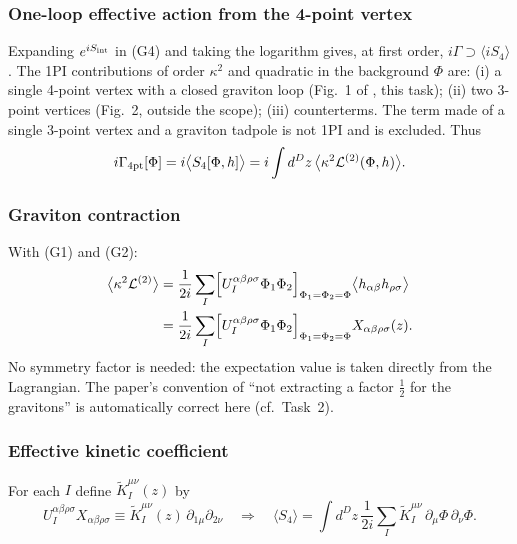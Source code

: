 \subsubsection{One-loop effective action from the 4-point vertex \texorpdfstring{\tD}{}}
Expanding \(e^{iS_{\rm int}}\) in (G4) and taking the logarithm gives, at first order,
\(i\Gamma\supset\langle iS_4\rangle\). The 1PI contributions of order \(\kappa^2\) and
quadratic in the background \(\Phi\) are:
(i) a single 4-point vertex with a closed graviton loop (Fig.~1 of \PI, this task);
(ii) two 3-point vertices (Fig.~2, outside the scope);
(iii) counterterms.
The term made of a single 3-point vertex and a graviton tadpole is not 1PI and is
excluded. Thus
\begin{equation}\label{eq:t3-Gamma4}
i\Gamma_{\rm 4pt}[\Phi]=i\bigl\langle S_4[\Phi,h]\bigr\rangle
=i\int d^Dz\,\bigl\langle\kappa^2\mathcal L^{(2)}(\Phi,h)\bigr\rangle .
\end{equation}

\subsubsection{Graviton contraction}
With (G1) and (G2):
\begin{equation}\label{eq:t3-contract}
\begin{aligned}
\bigl\langle\kappa^2\mathcal L^{(2)}\bigr\rangle
&=\frac1{2i}\sum_I\Bigl[U_I^{\alpha\beta\rho\sigma}\Phi_1\Phi_2\Bigr]_{\Phi_1=\Phi_2=\Phi}\bigl\langle h_{\alpha\beta}h_{\rho\sigma}\bigr\rangle\\
&=\frac1{2i}\sum_I\Bigl[U_I^{\alpha\beta\rho\sigma}\Phi_1\Phi_2\Bigr]_{\Phi_1=\Phi_2=\Phi}X_{\alpha\beta\rho\sigma}(z).
\end{aligned}
\end{equation}
No symmetry factor is needed: the expectation value is taken directly from the
Lagrangian. The paper's convention of ``not extracting a factor \(\tfrac12\) for the
gravitons'' is automatically correct here (cf.\ Task~2).

\subsubsection{Effective kinetic coefficient}
For each \(I\) define \(\tilde K_I^{\mu\nu}(z)\) by
\begin{equation}\label{eq:t3-Ktilde}
U_I^{\alpha\beta\rho\sigma}X_{\alpha\beta\rho\sigma}\equiv\tilde K_I^{\mu\nu}(z)\,\partial_{1\mu}\partial_{2\nu}
\quad\Longrightarrow\quad
\bigl\langle S_4\bigr\rangle=\int d^Dz\,\frac1{2i}\sum_I\tilde K_I^{\mu\nu}\,\partial_\mu\Phi\,\partial_\nu\Phi .
\end{equation}

